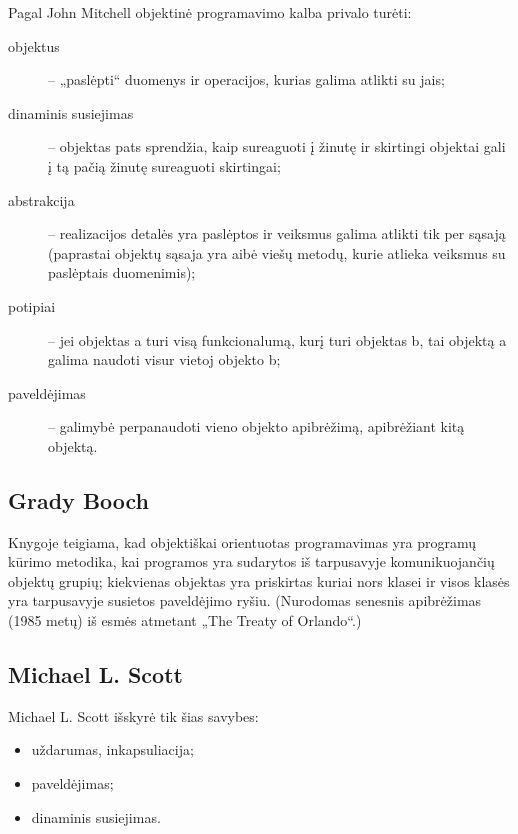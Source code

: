 Pagal John Mitchell \cite[277]{concepts-in-programming-languages}
objektinė programavimo kalba  privalo
turėti:
\begin{description}
  \item[objektus] – „paslėpti“ duomenys ir operacijos, kurias galima
    atlikti su jais;
  \item[dinaminis susiejimas]  – objektas pats
    sprendžia, kaip sureaguoti į žinutę ir skirtingi objektai gali
    į tą pačią žinutę sureaguoti skirtingai;
  \item[abstrakcija]  – realizacijos detalės yra
    paslėptos ir veiksmus galima atlikti tik per sąsają (paprastai
    objektų sąsaja yra aibė viešų metodų, kurie atlieka veiksmus
    su paslėptais duomenimis);
  \item[potipiai]  – jei objektas a turi visą funkcionalumą,
    kurį turi objektas b, tai objektą a galima naudoti visur vietoj
    objekto b;
  \item[paveldėjimas]  – galimybė perpanaudoti vieno
    objekto apibrėžimą, apibrėžiant kitą objektą.
\end{description}

\subsection{Grady Booch}

Knygoje \cite[41-42]{Booch:2007:OAD:1407387} teigiama, kad objektiškai
orientuotas programavimas yra programų kūrimo metodika, kai programos
yra sudarytos iš tarpusavyje komunikuojančių objektų grupių; kiekvienas
objektas yra priskirtas kuriai nors klasei ir visos klasės yra
tarpusavyje susietos paveldėjimo ryšiu. (Nurodomas senesnis
apibrėžimas (1985 metų) iš esmės atmetant „The Treaty of
Orlando“.)

\subsection{Michael L. Scott}

Michael L. Scott \cite[529-530]{programming-language-pragmatics}
išskyrė tik šias savybes:
\begin{itemize}
  \item uždarumas, inkapsuliacija;
  \item paveldėjimas;
  \item dinaminis susiejimas.
\end{itemize}

